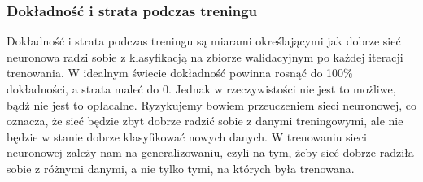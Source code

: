 \subsubsection{Dokładność i strata podczas treningu}\label{subsubsec:dokladnosc_i_strata_podczas_treningu}
Dokładność i strata podczas treningu są miarami określającymi jak dobrze sieć neuronowa radzi sobie z klasyfikacją na zbiorze walidacyjnym po każdej iteracji trenowania.
W idealnym świecie dokładność powinna rosnąć do 100\% dokładności, a strata maleć do 0. Jednak w rzeczywistości nie jest to możliwe, bądź nie jest to opłacalne.
Ryzykujemy bowiem przeuczeniem sieci neuronowej, co oznacza, że sieć będzie zbyt dobrze radzić sobie z danymi treningowymi, ale nie będzie w stanie dobrze klasyfikować nowych danych.
W trenowaniu sieci neuronowej zależy nam na generalizowaniu, czyli na tym, żeby sieć dobrze radziła sobie z różnymi danymi, a nie tylko tymi, na których była trenowana.
